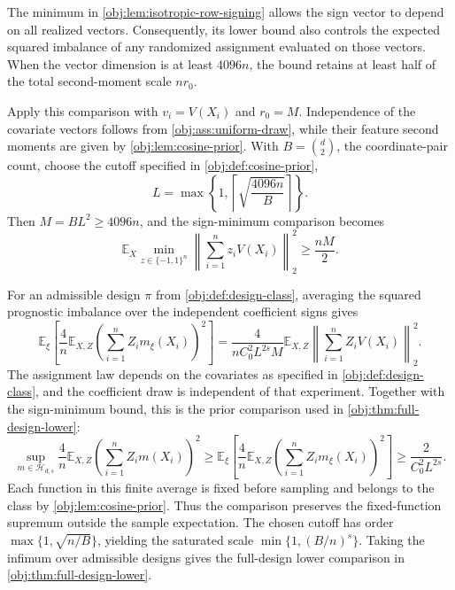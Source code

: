 The minimum in \cref{obj:lem:isotropic-row-signing} allows the sign vector to depend on all realized vectors. Consequently, its lower bound also controls the expected squared imbalance of any randomized assignment evaluated on those vectors. When the vector dimension is at least \(4096n\), the bound retains at least half of the total second-moment scale \(nr_0\).

Apply this comparison with \(v_i=V(X_i)\) and \(r_0=M\). Independence of the covariate vectors follows from \cref{obj:ass:uniform-draw}, while their feature second moments are given by \cref{obj:lem:cosine-prior}. With \(B=\binom d2\), the coordinate-pair count, choose the cutoff specified in \cref{obj:def:cosine-prior},
\[
L=\max\left\{1,\left\lceil\sqrt{\frac{4096n}{B}}\right\rceil\right\}.
\]
Then \(M=BL^2\geq4096n\), and the sign-minimum comparison becomes
\[
\mathbb E_X\min_{z\in\{-1,1\}^n}
\left\|\sum_{i=1}^n z_iV(X_i)\right\|_2^2
\geq\frac{nM}{2}.
\]

For an admissible design \(\pi\) from \cref{obj:def:design-class}, averaging the squared prognostic imbalance over the independent coefficient signs gives
\[
\mathbb E_\xi\!\left[
\frac4n\mathbb E_{X,Z}
\left(\sum_{i=1}^n Z_i m_\xi(X_i)\right)^2
\right]
=
\frac{4}{nC_0^2L^{2s}M}
\mathbb E_{X,Z}
\left\|\sum_{i=1}^n Z_iV(X_i)\right\|_2^2.
\]
The assignment law depends on the covariates as specified in \cref{obj:def:design-class}, and the coefficient draw is independent of that experiment. Together with the sign-minimum bound, this is the prior comparison used in \cref{obj:thm:full-design-lower}:
\[
\sup_{m\in\mathcal H_{d,s}}
\frac4n\mathbb E_{X,Z}
\left(\sum_{i=1}^n Z_i m(X_i)\right)^2
\geq
\mathbb E_\xi\!\left[
\frac4n\mathbb E_{X,Z}
\left(\sum_{i=1}^n Z_i m_\xi(X_i)\right)^2
\right]
\geq \frac{2}{C_0^2L^{2s}}.
\]
Each function in this finite average is fixed before sampling and belongs to the class by \cref{obj:lem:cosine-prior}. Thus the comparison preserves the fixed-function supremum outside the sample expectation. The chosen cutoff has order \(\max\{1,\sqrt{n/B}\}\), yielding the saturated scale \(\min\{1,(B/n)^s\}\). Taking the infimum over admissible designs gives the full-design lower comparison in \cref{obj:thm:full-design-lower}.
